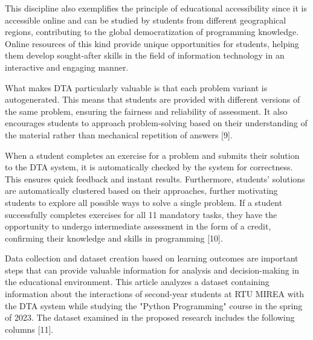 \documentclass[letterpaper]{article}
\begin{document}
\begin{multicols}{2}
\begin{justify}
      This discipline also exemplifies the principle of educational accessibility since it is accessible online and can be studied by students from different geographical regions, contributing to the global democratization of programming knowledge. Online resources of this kind provide unique opportunities for students, helping them develop sought-after skills in the field of information technology in an interactive and engaging manner.

      What makes DTA particularly valuable is that each problem variant is autogenerated. This means that students are provided with different versions of the same problem, ensuring the fairness and reliability of assessment. It also encourages students to approach problem-solving based on their understanding of the material rather than mechanical repetition of answers [9].

      When a student completes an exercise for a problem and submits their solution to the DTA system, it is automatically checked by the system for correctness. This ensures quick feedback and instant results. Furthermore, students' solutions are automatically clustered based on their approaches, further motivating students to explore all possible ways to solve a single problem. If a student successfully completes exercises for all 11 mandatory tasks, they have the opportunity to undergo intermediate assessment in the form of a credit, confirming their knowledge and skills in programming [10].

      Data collection and dataset creation based on learning outcomes are important steps that can provide valuable information for analysis and decision-making in the educational environment. This article analyzes a dataset containing information about the interactions of second-year students at RTU MIREA with the DTA system while studying the "Python Programming" course in the spring of 2023. The dataset examined in the proposed research includes the following columns [11].


    \end{justify}
  \end{multicols}
\end{document}
